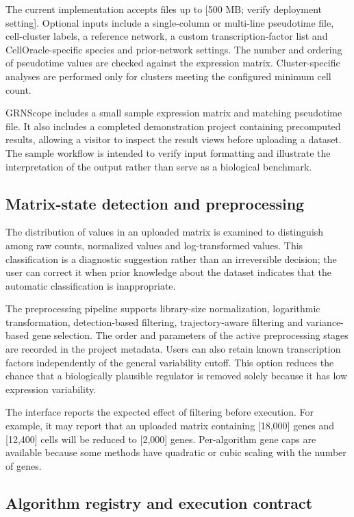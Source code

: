 \documentclass[unnumsec,webpdf,modern,large]{oup-authoring-template}%
\begin{document}
The current implementation accepts files up to [500 MB; verify deployment setting]. Optional inputs include a single-column or multi-line pseudotime file, cell-cluster labels, a reference network, a custom transcription-factor list and CellOracle-specific species and prior-network settings. The number and ordering of pseudotime values are checked against the expression matrix. Cluster-specific analyses are performed only for clusters meeting the configured minimum cell count.

GRNScope includes a small sample expression matrix and matching pseudotime file. It also includes a completed demonstration project containing precomputed results, allowing a visitor to inspect the result views before uploading a dataset. The sample workflow is intended to verify input formatting and illustrate the interpretation of the output rather than serve as a biological benchmark.

\subsection{Matrix-state detection and preprocessing}

The distribution of values in an uploaded matrix is examined to distinguish among raw counts, normalized values and log-transformed values. This classification is a diagnostic suggestion rather than an irreversible decision; the user can correct it when prior knowledge about the dataset indicates that the automatic classification is inappropriate.

The preprocessing pipeline supports library-size normalization, logarithmic transformation, detection-based filtering, trajectory-aware filtering and variance-based gene selection. The order and parameters of the active preprocessing stages are recorded in the project metadata. Users can also retain known transcription factors independently of the general variability cutoff. This option reduces the chance that a biologically plausible regulator is removed solely because it has low expression variability.

The interface reports the expected effect of filtering before execution. For example, it may report that an uploaded matrix containing [18,000] genes and [12,400] cells will be reduced to [2,000] genes. Per-algorithm gene caps are available because some methods have quadratic or cubic scaling with the number of genes.

\subsection{Algorithm registry and execution contract}
\end{document}
